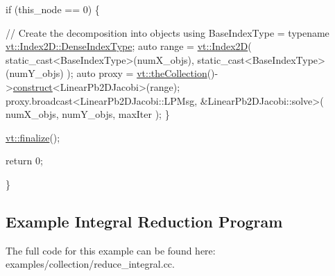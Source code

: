 \begin{DoxyCodeInclude}
  \textcolor{keywordflow}{if} (this\_node == 0) \{

    \textcolor{comment}{// Create the decomposition into objects}
    \textcolor{keyword}{using} BaseIndexType = \textcolor{keyword}{typename} \hyperlink{structvt_1_1index_1_1_dense_index_array_a36698427e28045290d1fb072573275ec}{vt::Index2D::DenseIndexType};
    \textcolor{keyword}{auto} range = \hyperlink{namespacevt_a3bab786053b74a3d856fff1412ffa73a}{vt::Index2D}(
      static\_cast<BaseIndexType>(numX\_objs),
      static\_cast<BaseIndexType>(numY\_objs)
    );
    \textcolor{keyword}{auto} proxy = \hyperlink{namespacevt_a1c45ce63bfd2c327ff7d76a319a371d8}{vt::theCollection}()->\hyperlink{structvt_1_1vrt_1_1collection_1_1_collection_manager_a4de84e9efd7a3948e3c20be549441cfd}{construct}<LinearPb2DJacobi>(range);
    proxy.broadcast<LinearPb2DJacobi::LPMsg, &LinearPb2DJacobi::solve>(
      numX\_objs, numY\_objs, maxIter
    );
  \}

  \hyperlink{namespacevt_a540d90dbd6e97b69f1dcbc9ee9314cff}{vt::finalize}();

  \textcolor{keywordflow}{return} 0;

\}
\end{DoxyCodeInclude}
\hypertarget{reduce-integral-example}{}\subsection{Example Integral Reduction Program}\label{reduce-integral-example}
The full code for this example can be found here\+: {\ttfamily examples/collection/reduce\+\_\+integral.\+cc}.


